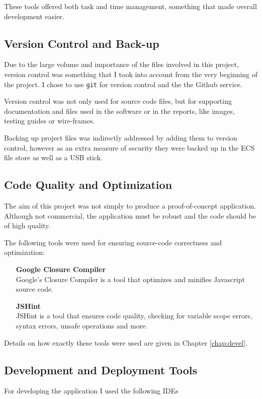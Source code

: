 \documentclass[12pt]{ecsproject}     %
\begin{document}
These tools offered both task and time management, something that made overall development easier.

\subsection{Version Control and Back-up}
Due to the large volume and importance of the files involved in this project, version control was something that I took into account from the very beginning of the project. I chose to use \texttt{git} for version control and the the Github service. 

Version control was not only used for source code files, but for supporting documentation and files used in the software or in the reports, like images, testing guides or wire-frames.

Backing up project files was indirectly addressed by adding them to version control, however as an extra measure of security they were backed up in the ECS file store as well as a USB stick.

\subsection{Code Quality and Optimization}
The aim of this project was not simply to produce a proof-of-concept application. Although not commercial, the application must be robust and the code should be of high quality.

The following tools were used for ensuring source-code correctness and optimization:

\begin{itemize}
\item[\textbf{Google Closure Compiler}] \hfill \\
Google's Closure Compiler is a tool that optimizes and minifies Javascript source code.
\item[\textbf{JSHint}]\hfill \\
JSHint is a tool that ensures code quality, checking for variable scope errors, syntax errors, unsafe operations and more.
\end{itemize}

Details on how exactly these tools were used are given in Chapter \ref{chap:devel}.

\subsection{Development and Deployment Tools}
For developing the application I used the following IDEs
\end{document}

